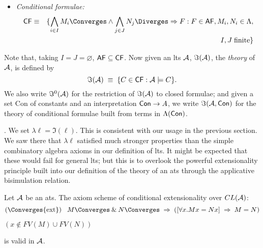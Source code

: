 {\begin{definition}
{\begin{itemize}
\begin{eqnarray*}
\end{eqnarray*} 
\item {\em Conditional formulae:}
\begin{eqnarray*}
{\sf CF} & \equiv & \{ \bigwedge_{i \in I} M_{i} \Converges \wedge \bigwedge_{j \in J} N_{j} \Diverges \Rightarrow F : F \in {\sf AF}, M_{i}, N_{i} \in \Lambda, \\
& &  I, J \; {\rm finite} \}
\end{eqnarray*} 
\end{itemize}
Note that, taking $I = J = \varnothing$, ${\sf AF} \subseteq {\sf CF}$. 
Now given an lts ${\cal A}$, ${\Im}({\cal A})$, the {\em theory} of ${\cal A}$, is defined by
\[  {\Im}({\cal A}) \; \equiv \; \{ C \in {\sf CF} : {\cal A} \models C \} . \]
We also write ${\Im}^{0}({\cal A})$ for the restriction of 
${\Im}({\cal A})$ to closed formulae; 
and given a set {\sf Con} of constants and an interpretation 
${\sf Con} \rightarrow A$, we write ${\Im}({\cal A}, {\sf Con})$ 
for the theory of conditional formulae built from terms in $\Lambda ({\sf Con})$.}
\end{definition}

. 
We set $\lambda \ell = {\Im}(\ell )$. 
This is consistent with our usage in the previous section. 
We saw there that $\lambda \ell$ satisfied much stronger properties than the 
simple combinatory algebra axioms in our definition of lts. 
It might be expected that these would fail for general lts; 
but this is to overlook the powerful extensionality principle built into our 
definition of the theory of an ats through the applicative bisimulation 
relation.
\begin{proposition}
\label{extprop}
Let ${\cal A}$ be an ats. The axiom scheme of {\rm conditional extensionality} over $CL({\cal A})$:
\[ (\Converges {\rm ext}) \;\;\; M\Converges \: \& \: N \Converges \; \Rightarrow \; ([\forall x . M x = N x] \; \Rightarrow \; M = N) \]
\begin{flushright}
$(x \not\in FV(M) \cup FV(N))$
\end{flushright}
is valid in ${\cal A}$.
\end{proposition}

}

